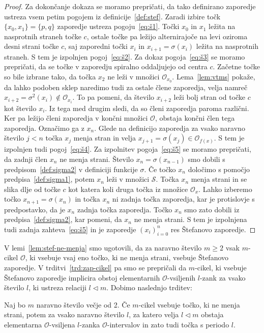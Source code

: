 \documentclass[../TG_magistrsko_delo_sections.tex]{subfiles}
\begin{document}
\begin{proof}
Za dokončanje dokaza se moramo prepričati, da tako definirano zaporedje ustreza vsem petim pogojem iz definicije~\ref{def:stef}.
Zaradi izbire točk $\{x_0, x_1\} = \{p, q\}$ zaporedje ustreza pogoju~\ref{eq:š1}.
Točki $x_0$ in $x_1$ ležita na nasprotnih straneh točke $c$, ostale točke pa ležijo alternirajoče na levi oziroma desni strani točke $c$, saj zaporedni točki $x_i$ in $x_{i+1}=\sigma(x_i)$ ležita na nasprotnih straneh. S tem je izpolnjen pogoj~\ref{eq:š2}.
Za dokaz pogoja~\ref{eq:š3} se moramo prepričati, da se točke v zaporedju spiralno oddaljujejo od centra $c$. Začetne točke so bile izbrane tako, da točka $x_2$ ne leži v množici $\mathcal{O}_{x_0}$. Lema~\ref{lem:vtms} pokaže, da lahko podoben sklep naredimo tudi za ostale člene zaporedja, velja namreč $x_{i+2} = \sigma^2(x_i) \notin \mathcal{O}_{x_i}$. To pa pomeni, da število $x_{i+2}$ leži bolj stran od točke $c$ kot število $x_i$. Iz tega med drugim sledi, da so členi zaporedja paroma različni. Ker pa ležijo členi zaporedja v končni množici $\mathcal{O}$, obstaja končni člen tega zaporedja. Označimo ga z $x_n$.
Glede na definicijo zaporedja za vsako naravno število $j<n$ točka $x_j$ menja stran in velja $x_{j+1} = \sigma(x_j) \in \mathcal{O}_{f(x)}$. S tem je izpolnjen tudi pogoj~\ref{eq:š4}.
Za izpolnitev pogoja~\ref{eq:š5} se moramo prepričati, da zadnji člen $x_n$ ne menja strani. Število $x_n=\sigma(x_{n-1})$ smo dobili s predpisom~\ref{def:sigma2} v definiciji funkcije $\sigma$. Če točko $x_n$ določimo s pomočjo predpisa~\ref{def:sigma1}, potem $x_n$ leži v množici $\mathcal{S}$. Točka $x_n$ menja strani in se slika dlje od točke $c$ kot katera koli druga točka iz množice $\mathcal{O}_x$. Lahko izberemo točko $x_{n+1} = \sigma(x_n)$ in točka $x_n$ ni zadnja točka zaporedja, kar je protislovje s predpostavko, da je $x_n$ zadnja točka zaporedja. Točko $x_n$ smo zato dobili iz predpisa~\ref{def:sigma2}, kar pomeni, da $x_n$ ne menja strani. S tem je izpolnjena tudi zadnja zahteva~\ref{eq:š5} in je zaporedje $\left(x_i\right)_{i=0}^n$ res Štefanovo zaporedje. 
\end{proof}
V lemi~\ref{lem:stef-ne-menja} smo ugotovili, da za naravno število $m \geq 2$ vsak $m$-cikel $\mathcal{O}$, ki vsebuje vsaj eno točko, ki ne menja strani, vsebuje Štefanovo zaporedje. V trditvi~\ref{trd:zap-cikel} pa smo se prepričali da $m$-cikel, ki vsebuje Štefanovo zaporedje implicira obstoj elementarnih $\mathcal{O}$-vsiljenih $l$-zank za vsako število $l$, ki ustreza relaciji $l\triangleleft m$. Dobimo naslednjo trditev: 

\begin{trditev}\label{trd:tnmsoc}
Naj bo $m$ naravno število večje od 2. Če $m$-cikel vsebuje točko, ki ne menja strani, potem za vsako naravno število $l$, za katero velja $l \triangleleft m$ obstaja elementarna $\mathcal{O}$-vsiljena $l$-zanka $\mathcal{O}$-intervalov in zato tudi točka s periodo $l$.
\end{trditev}
\end{document}
